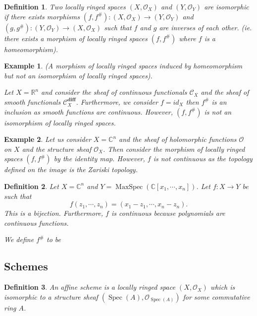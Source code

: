\documentclass{article}
\newtheorem{definition}{Definition}[section]
\newtheorem{example}{Example}[section]
\numberwithin{equation}{section}
\DeclareMathOperator{\Spec}{Spec}
\DeclareMathOperator{\MaxSpec}{MaxSpec}
\begin{document}
\begin{definition}
Two locally ringed spaces $(X,\mathcal{O}_X)$ and $(Y,\mathcal{O}_Y)$ are isomorphic if there exists morphisms $(f,f^{\#}):(X,\mathcal{O}_X)\to(Y,\mathcal{O}_Y)$ and $(g,g^{\#}):(Y,\mathcal{O}_Y)\to(X,\mathcal{O}_X)$ such that $f$ and $g$ are inverses of each other. (ie. there exists a morphism of locally ringed spaces $(f,f^{\#})$ where $f$ is a homeomorphism).%
\end{definition}

\begin{example}(A morphism of locally ringed spaces induced by homeomorphism but not an isomorphism of locally ringed spaces).\\
\par Let $X=\mathbb{R}^n$ and consider the sheaf of continuous functionals $\mathcal{C}_X$ and the sheaf of smooth functionals $\mathcal{C}^{\mathbf{diff}}_X$. Furthermore, we consider $f=id_X$ then $f^{\#}$ is an inclusion as smooth functions are continuous. 
However, $(f,f^{\#})$ is not an isomorphism of locally ringed spaces.
\end{example}

\begin{example}
Let us consider $X=\mathbb{C}^n$ and the sheaf of holomorphic functions $\mathcal{O}$ on $X$ and the structure sheaf $\mathcal{O}_X$. Then consider the morphism of locally ringed spaces $(f,f^{\#})$ by the identity map. However, $f$ is not continuous as the topology defined on the image is the Zariski topology.
\end{example}

\begin{definition}
Let $X=\mathbb{C}^n$ and $Y=\MaxSpec(\mathbb{C}[x_1,\cdots,x_n])$. Let $f:X\to Y$ be such that
\begin{equation*}
f(z_1,\cdots,z_n) = (x_1-z_1,\cdots,x_n-z_n).
\end{equation*}
This is a bijection. Furthermore, $f$ is continuous because polynomials are continuous functions. \\%
\par We define $f^{\#}$ to be 
\end{definition}

\subsection{Schemes}

\begin{definition}
An affine scheme is a locally ringed space $(X,\mathcal{O}_X)$ which is isomorphic to a structure sheaf $(\Spec(A),\mathcal{O}_{\Spec(A)})$ for some commutative ring $A$. %
\end{definition}
\end{document}
